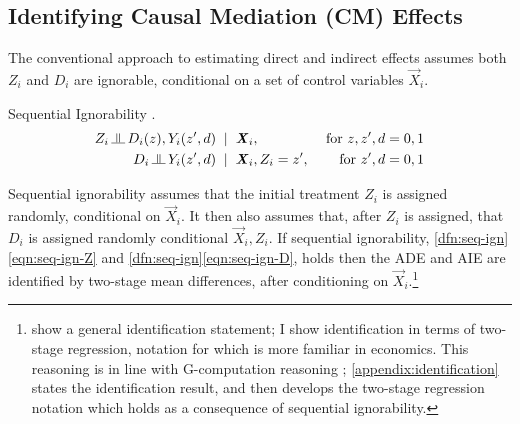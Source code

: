 \subsection{Identifying Causal Mediation (CM) Effects}
The conventional approach to estimating direct and indirect effects assumes both $Z_i$ and $D_i$ are ignorable, conditional on a set of control variables $\vec X_i$.
\begin{definition}
    \label{dfn:seq-ign}
    Sequential Ignorability \citep{imai2010identification}.
    \begin{align}
        \label{eqn:seq-ign-Z}
        Z_i \indep  D_i(z), Y_i(z', d) \;\; &| \;\; \vec X_i,
            &\textnormal{ for } z, z', d = 0, 1 \\
        \label{eqn:seq-ign-D}
        D_i \indep Y_i(z', d) \;\; &| \;\; \vec X_i, Z_i = z', 
            &\textnormal{ for } z', d = 0, 1
    \end{align}
\end{definition}
Sequential ignorability assumes that the initial treatment $Z_i$ is assigned randomly, conditional on $\vec X_i$.
It then also assumes that, after $Z_i$ is assigned, that $D_i$ is assigned randomly conditional $\vec X_i, Z_i$.
If sequential ignorability, \ref{dfn:seq-ign}\eqref{eqn:seq-ign-Z} and \ref{dfn:seq-ign}\eqref{eqn:seq-ign-D}, holds then the ADE and AIE are identified by two-stage mean differences, after conditioning on $\vec X_i$.\footnote{
    \cite{imai2010identification} show a general identification statement; I show identification in terms of two-stage regression, notation for which is more familiar in economics.
    This reasoning is in line with G-computation reasoning \citep{robins1986g};
    \autoref{appendix:identification} states the \cite{imai2010identification} identification result, and then develops the two-stage regression notation which holds as a consequence of sequential ignorability.
}

